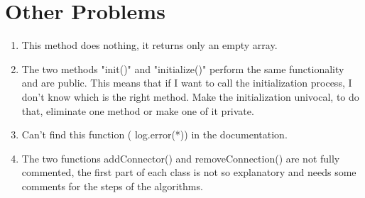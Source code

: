 \documentclass[../../dd.tex]{subfiles}
\begin{document}
	\chapter{Other Problems}
	
	\begin{enumerate}
	
	

	\item 
	

	This method does nothing, it returns only an empty array.
	
	\item The two methods "init()" and "initialize()" perform the same functionality and are public. This means that if I want to call the initialization process, I don't know which is the right method. Make the initialization univocal, to do that, eliminate one method or make one of it private.
	
\item 
 
	
	Can't find this function ( log.error(*)) in the documentation.
	
\item	The two functions addConnector() and removeConnection() are not fully commented, the first part of each class is not so explanatory and needs some comments for the steps of the algorithms.
	
	
\end{enumerate}
\end{document}
